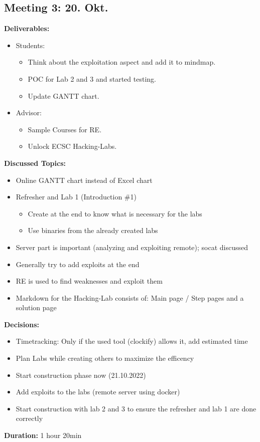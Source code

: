 \subsection*{Meeting 3: 20. Okt.}
\textbf{Deliverables:} 
\begin{itemize}
    \item Students:
    \begin{itemize}
        \item Think about the exploitation aspect and add it to mindmap.
        \item POC for Lab 2 and 3 and started testing.
        \item Update GANTT chart.
    \end{itemize}
    \item Advisor:
    \begin{itemize}
        \item Sample Courses for RE.
        \item Unlock ECSC Hacking-Labs. 
    \end{itemize}
\end{itemize}
\textbf{Discussed Topics:} 
\begin{itemize}
    \item Online GANTT chart instead of Excel chart
    \item Refresher and Lab 1 (Introduction \#1)
    \begin{itemize}
        \item Create at the end to know what is necessary for the labs
        \item Use binaries from the already created labs
    \end{itemize}
    \item Server part is important (analyzing and exploiting remote); socat discussed
    \item Generally try to add exploits at the end
    \item RE is used to find weaknesses and exploit them
    \item Markdown for the Hacking-Lab consists of: Main page / Step pages and a solution page
\end{itemize}
\textbf{Decisions:}
\begin{itemize}
    \item Timetracking: Only if the used tool (clockify) allows it, add estimated time
    \item Plan Labs while creating others to maximize the efficency
    \item Start construction phase now (21.10.2022)
    \item Add exploits to the labs (remote server using docker)
    \item Start construction with lab 2 and 3 to ensure the refresher and lab 1 are done correctly
\end{itemize}
\textbf{Duration:} 1 hour 20min
